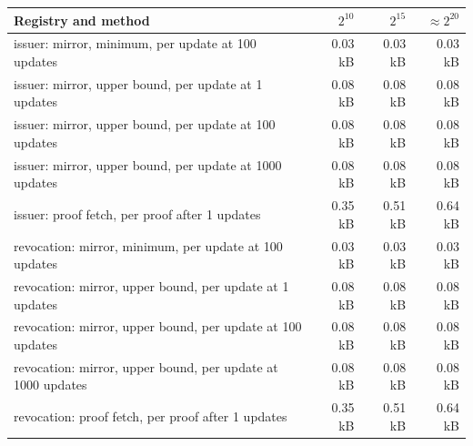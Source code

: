 \begin{tabular}{lrrr}
\toprule
Registry and method & $2^{10}$ & $2^{15}$ & $\approx 2^{20}$ \\
\midrule
issuer: mirror, minimum, per update at 100 updates & 0.03 kB & 0.03 kB & 0.03 kB \\
issuer: mirror, upper bound, per update at 1 updates & 0.08 kB & 0.08 kB & 0.08 kB \\
issuer: mirror, upper bound, per update at 100 updates & 0.08 kB & 0.08 kB & 0.08 kB \\
issuer: mirror, upper bound, per update at 1000 updates & 0.08 kB & 0.08 kB & 0.08 kB \\
issuer: proof fetch, per proof after 1 updates & 0.35 kB & 0.51 kB & 0.64 kB \\
revocation: mirror, minimum, per update at 100 updates & 0.03 kB & 0.03 kB & 0.03 kB \\
revocation: mirror, upper bound, per update at 1 updates & 0.08 kB & 0.08 kB & 0.08 kB \\
revocation: mirror, upper bound, per update at 100 updates & 0.08 kB & 0.08 kB & 0.08 kB \\
revocation: mirror, upper bound, per update at 1000 updates & 0.08 kB & 0.08 kB & 0.08 kB \\
revocation: proof fetch, per proof after 1 updates & 0.35 kB & 0.51 kB & 0.64 kB \\
\bottomrule
\end{tabular}
